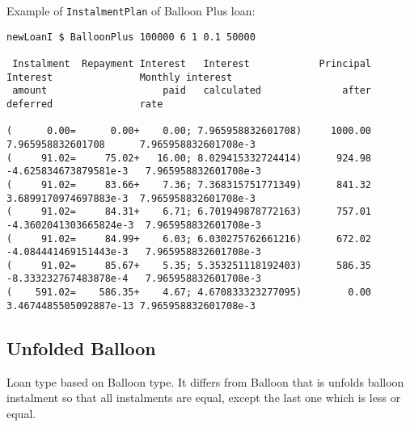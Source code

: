 \documentclass[letterpaper,11pt]{article}
\begin{document}
Example of {\tt InstalmentPlan} of Balloon Plus loan:
{\footnotesize
\begin{verbatim}
newLoanI $ BalloonPlus 100000 6 1 0.1 50000

 Instalment  Repayment Interest   Interest            Principal  Interest               Monthly interest
 amount                    paid   calculated              after  deferred               rate

(      0.00=      0.00+    0.00; 7.965958832601708)     1000.00  7.965958832601708      7.965958832601708e-3
(     91.02=     75.02+   16.00; 8.029415332724414)      924.98 -4.625834673879581e-3   7.965958832601708e-3
(     91.02=     83.66+    7.36; 7.368315751771349)      841.32  3.6899170974697883e-3  7.965958832601708e-3
(     91.02=     84.31+    6.71; 6.701949878772163)      757.01 -4.3602041303665824e-3  7.965958832601708e-3
(     91.02=     84.99+    6.03; 6.030275762661216)      672.02 -4.084441469151443e-3   7.965958832601708e-3
(     91.02=     85.67+    5.35; 5.353251118192403)      586.35 -8.333232767483878e-4   7.965958832601708e-3
(    591.02=    586.35+    4.67; 4.670833323277095)        0.00  3.4674485505092887e-13 7.965958832601708e-3
\end{verbatim}
}

\subsection{Unfolded Balloon}
Loan type based on Balloon type. It differs from Balloon that is unfolds balloon instalment so
that all instalments are equal, except the last one which is less or equal.
\end{document}
